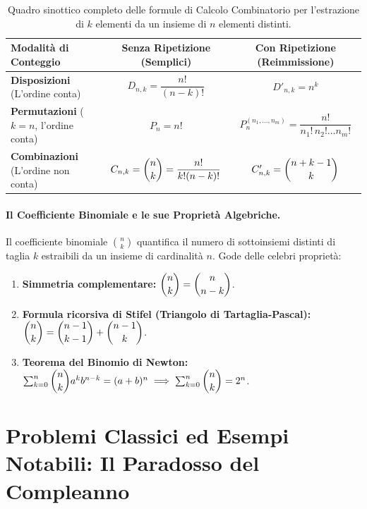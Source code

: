 \begin{table}[htbp]
\centering
\caption{Quadro sinottico completo delle formule di Calcolo Combinatorio per l'estrazione di $k$ elementi da un insieme di $n$ elementi distinti.}
\label{tab:combinatoria_sinottica}
\begin{tabular}{lcc}
\toprule
\textbf{Modalità di Conteggio} & \textbf{Senza Ripetizione (Semplici)} & \textbf{Con Ripetizione (Reimmissione)} \\
\midrule
\textbf{Disposizioni} (L'ordine conta) & $D_{n,k} = \dfrac{n!}{(n-k)!}$ & $D'_{n,k} = n^k$ \\[10pt]
\textbf{Permutazioni} ($k = n$, l'ordine conta) & $P_n = n!$ & $P_n^{(n_1, \dots, n_m)} = \dfrac{n!}{n_1! \, n_2! \dots n_m!}$ \\[10pt]
\textbf{Combinazioni} (L'ordine non conta) & $C_{n,k} = \dbinom{n}{k} = \dfrac{n!}{k!(n-k)!}$ & $C'_{n,k} = \dbinom{n+k-1}{k}$ \\
\bottomrule
\end{tabular}
\end{table}

\paragraph{Il Coefficiente Binomiale e le sue Proprietà Algebriche.}
Il coefficiente binomiale $\binom{n}{k}$ quantifica il numero di sottoinsiemi distinti di taglia $k$ estraibili da un insieme di cardinalità $n$. Gode delle celebri proprietà:
\begin{enumerate}
    \item \textbf{Simmetria complementare:} $\dbinom{n}{k} = \dbinom{n}{n-k}$.
    \item \textbf{Formula ricorsiva di Stifel (Triangolo di Tartaglia-Pascal):} $\dbinom{n}{k} = \dbinom{n-1}{k-1} + \dbinom{n-1}{k}$.
    \item \textbf{Teorema del Binomio di Newton:} $\sum_{k=0}^n \dbinom{n}{k} a^k b^{n-k} = (a + b)^n \implies \sum_{k=0}^n \dbinom{n}{k} = 2^n$.
\end{enumerate}

\section{Problemi Classici ed Esempi Notabili: Il Paradosso del Compleanno}
\label{sec:paradosso_compleanno}

